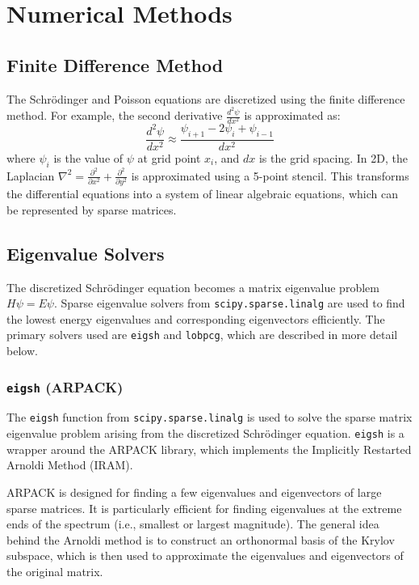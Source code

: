 \documentclass{article}
\begin{document}
\section{Numerical Methods}
\subsection{Finite Difference Method}
The Schrödinger and Poisson equations are discretized using the finite difference method. For example, the second derivative $\frac{d^2\psi}{dx^2}$ is approximated as:
\begin{equation}
	\frac{d^2\psi}{dx^2} \approx \frac{\psi_{i+1} - 2\psi_i + \psi_{i-1}}{dx^2}
\end{equation}
where $\psi_i$ is the value of $\psi$ at grid point $x_i$, and $dx$ is the grid spacing. In 2D, the Laplacian $\nabla^2 = \frac{\partial^2}{\partial x^2} + \frac{\partial^2}{\partial y^2}$ is approximated using a 5-point stencil. This transforms the differential equations into a system of linear algebraic equations, which can be represented by sparse matrices.

\subsection{Eigenvalue Solvers}
The discretized Schrödinger equation becomes a matrix eigenvalue problem $H\psi = E\psi$. Sparse eigenvalue solvers from \texttt{scipy.sparse.linalg} are used to find the lowest energy eigenvalues and corresponding eigenvectors efficiently. The primary solvers used are \texttt{eigsh} and \texttt{lobpcg}, which are described in more detail below.

\subsubsection{\texttt{eigsh} (ARPACK)}
The \texttt{eigsh} function from \texttt{scipy.sparse.linalg} is used to solve the sparse matrix eigenvalue problem arising from the discretized Schrödinger equation. \texttt{eigsh} is a wrapper around the ARPACK library, which implements the Implicitly Restarted Arnoldi Method (IRAM).

ARPACK is designed for finding a few eigenvalues and eigenvectors of large sparse matrices. It is particularly efficient for finding eigenvalues at the extreme ends of the spectrum (i.e., smallest or largest magnitude). The general idea behind the Arnoldi method is to construct an orthonormal basis of the Krylov subspace, which is then used to approximate the eigenvalues and eigenvectors of the original matrix.
\end{document}
